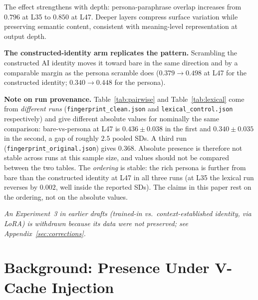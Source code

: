 \documentclass[11pt,a4paper]{article}
\begin{document}
The effect strengthens with depth: persona-paraphrase overlap increases
from $0.796$ at L35 to $0.850$ at L47. Deeper layers compress surface
variation while preserving semantic content, consistent with meaning-level
representation at output depth.

\textbf{The constructed-identity arm replicates the pattern.} Scrambling
the constructed AI identity moves it toward bare in the same direction and
by a comparable margin as the persona scramble does ($0.379 \to 0.498$ at
L47 for the constructed identity; $0.340 \to 0.448$ for the persona).

\textbf{Note on run provenance.} Table~\ref{tab:pairwise} and
Table~\ref{tab:lexical} come from \emph{different runs}
(\texttt{fingerprint\_clean.json} and \texttt{lexical\_control.json}
respectively) and give different absolute values for nominally the same
comparison: bare-vs-persona at L47 is $0.436 \pm 0.038$ in the first and
$0.340 \pm 0.035$ in the second, a gap of roughly $2.5$ pooled SDs. A third
run (\texttt{fingerprint\_original.json}) gives $0.368$. Absolute presence
is therefore not stable across runs at this sample size, and values should
not be compared between the two tables. The \emph{ordering} is stable: the
rich persona is further from bare than the constructed identity at L47 in
all three runs (at L35 the lexical run reverses by $0.002$, well inside the
reported SDs). The claims in this paper rest on the ordering, not on the
absolute values.

\emph{An Experiment~3 in earlier drafts (trained-in vs.\ context-established
identity, via LoRA) is withdrawn because its data were not preserved; see
Appendix~\ref{sec:corrections}.}

\section{Background: Presence Under V-Cache Injection}
\label{sec:vcache}
\end{document}
